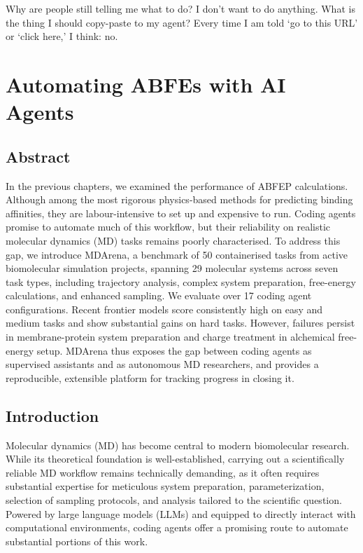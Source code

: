 \begin{savequote}[75mm]
Why are people still telling me what to do? I don't want to do anything. What is the thing I should copy-paste to my agent? Every time I am told `go to this URL' or `click here,' I think: no.
\end{savequote}

\chapter{Automating ABFEs with AI Agents}
\label{ch:automating-abfes-with-ai-agents}
\section*{Abstract}
In the previous chapters, we examined the performance of ABFEP calculations. Although among the most rigorous physics-based methods for predicting binding affinities, they are labour-intensive to set up and expensive to run. Coding agents promise to automate much of this workflow, but their reliability on realistic molecular dynamics (MD) tasks remains poorly characterised. To address this gap, we introduce MDArena, a benchmark of 50 containerised tasks from active biomolecular simulation projects, spanning 29 molecular systems across seven task types, including trajectory analysis, complex system preparation, free-energy calculations, and enhanced sampling. We evaluate over 17 coding agent configurations. Recent frontier models score consistently high on easy and medium tasks and show substantial gains on hard tasks. However, failures persist in membrane-protein system preparation and charge treatment in alchemical free-energy setup. MDArena thus exposes the gap between coding agents as supervised assistants and as autonomous MD researchers, and provides a reproducible, extensible platform for tracking progress in closing it.



\section{Introduction}

Molecular dynamics (MD) has become central to modern biomolecular research.\cite{hollingsworth2018molecular,huggins2019biomolecular} While its theoretical foundation is well-established, carrying out a scientifically reliable MD workflow remains technically demanding, as it often requires substantial expertise for meticulous system preparation, parameterization, selection of sampling protocols, and analysis tailored to the scientific question. Powered by large language models (LLMs)\cite{zhao2023survey} and equipped to directly interact with computational environments, coding agents\cite{liu2024large} offer a promising route to automate substantial portions of this work. 

